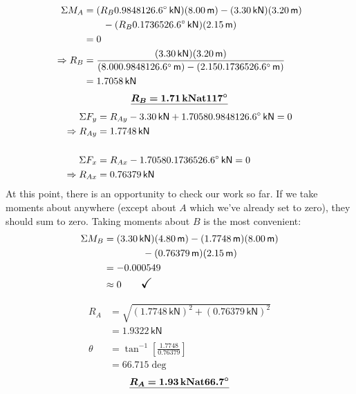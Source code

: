 \documentclass[10pt,oneside]{article}
\begin{document}
\begin{textblock*}{3.5in}
{  }

  \begin{align*}
				\Sigma M_A & = (R_B 0.98481 26.6^\circ\,\mathsf{kN}) (8.00\,\mathsf{m})-(3.30\,\mathsf{kN})(3.20\,\mathsf{m})                        \\
				          & \qquad -(R_B 0.17365 26.6^\circ\,\mathsf{kN}) (2.15\,\mathsf{m}) \\
				          & = 0 \\
				\Rightarrow R_B & = \frac{(3.30\,\mathsf{kN})(3.20\,\mathsf{m})}{(8.000.98481 26.6^\circ\,\mathsf{m})-(2.150.17365 26.6^\circ\,\mathsf{m})} \\
				                & = 1.7058\,\mathsf{kN}
			\end{align*}\Large
      $$\underline{ \bm{R_B=1.71\,\mathsf{\bf kN at }117^\circ}}$$
      \normalsize
      \begin{align*}
        \Sigma F_y & = R_{Ay}-3.30\,\mathsf{kN}+1.70580.98481 26.6^\circ\,\mathsf{kN} = 0 \\
				\Rightarrow R_{Ay} & = 1.7748\,\mathsf{kN}  \\\\
				\Sigma F_x & = R_{Ax}-1.70580.17365 26.6^\circ\,\mathsf{kN} = 0 \\
				\Rightarrow R_{Ax} & = 0.76379\,\mathsf{kN}
      \end{align*}
      At this point, there is an opportunity to check our work so far. If we take moments about anywhere (except about $A$ which we've already set to zero), they should sum to zero. Taking moments about $B$ is the most convenient:
      \begin{align*}
				\Sigma M_B & = (3.30\,\mathsf{kN})(4.80\,\mathsf{m})-(1.7748\,\mathsf{m})(8.00\,\mathsf{m}) \\
				           & \qquad\qquad-(0.76379\,\mathsf{m})(2.15\,\mathsf{m})                       \\
				           & = -0.000549                                                            \\
				           & \approx 0 \qquad\textsf{\Large \checkmark}
			\end{align*}

      \begin{align*}
				R_A    & = \sqrt{(1.7748\,\mathsf{kN})^2+(0.76379\,\mathsf{kN})^2} \\
				       & = 1.9322\,\mathsf{kN}                                   \\\\
				\theta & = \tan^{-1}\left[\frac{1.7748}{0.76379}\right]        \\
				       & = 66.715\deg
			\end{align*}
      \Large
      $$ \underline{\bm{R_A=1.93\,\mathsf{\bf kN at }66.7^\circ}}$$

\end{textblock*}
\end{document}
